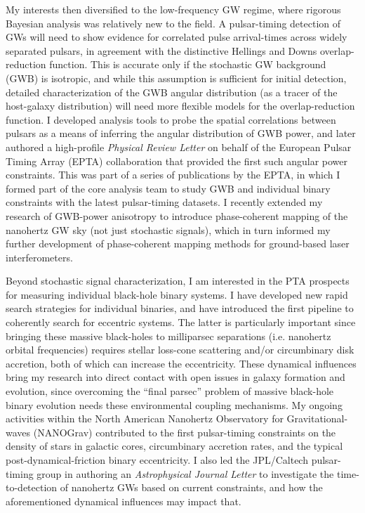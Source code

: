 \documentclass[11pt,letterpaper,sans]{moderncv} %
\begin{document}
My interests then diversified to the low-frequency GW regime, where rigorous Bayesian analysis was relatively new to the field. A pulsar-timing detection of GWs will need to show evidence for correlated pulse arrival-times across widely separated pulsars, in agreement with the distinctive Hellings and Downs overlap-reduction function. This is accurate only if the stochastic GW background (GWB) is isotropic, and while this assumption is sufficient for initial detection, detailed characterization of the GWB angular distribution (as a tracer of the host-galaxy distribution) will need more flexible models for the overlap-reduction function. I developed analysis tools to probe the spatial correlations between pulsars as a means of inferring the angular distribution of GWB power, and later authored a high-profile \textit{Physical Review Letter} on behalf of the European Pulsar Timing Array (EPTA) collaboration that provided the first such angular power constraints. This was part of a series of publications by the EPTA, in which I formed part of the core analysis team to study GWB and individual binary constraints with the latest pulsar-timing datasets. I recently extended my research of GWB-power anisotropy to introduce phase-coherent mapping of the nanohertz GW sky (not just stochastic signals), which in turn informed my further development of phase-coherent mapping methods for ground-based laser interferometers.
\vspace{1.5mm}

Beyond stochastic signal characterization, I am interested in the PTA prospects for measuring individual black-hole binary systems. I have developed new rapid search strategies for individual binaries, and have introduced the first pipeline to coherently search for eccentric systems. The latter is particularly important since bringing these massive black-holes to milliparsec separations (i.e. nanohertz orbital frequencies) requires stellar loss-cone scattering and/or circumbinary disk accretion, both of which can increase the eccentricity. These dynamical influences bring my research into direct contact with open issues in galaxy formation and evolution, since overcoming the ``final parsec'' problem of massive black-hole binary evolution needs these environmental coupling mechanisms. My ongoing activities within the North American Nanohertz Observatory for Gravitational-waves (NANOGrav) contributed to the first pulsar-timing constraints on the density of stars in galactic cores, circumbinary accretion rates, and the typical post-dynamical-friction binary eccentricity. I also led the JPL/Caltech pulsar-timing group in authoring an \textit{Astrophysical Journal Letter} to investigate the time-to-detection of nanohertz GWs based on current constraints, and how the aforementioned dynamical influences may impact that.
\vspace{1.5mm}
\end{document}
